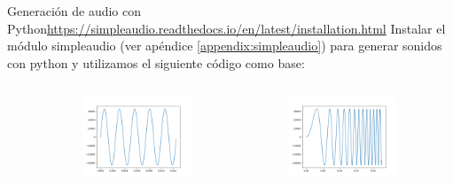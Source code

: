  \begin{frame}[t]{Generación de audio con Python}{\tiny{\href{https://simpleaudio.readthedocs.io/en/latest/installation.html}{https://simpleaudio.readthedocs.io/en/latest/installation.html}}}
    \handsonicon
    \normalsize
    Instalar el módulo simpleaudio \tiny{(ver apéndice \ref{appendix:simpleaudio})} \normalsize para generar sonidos con python y utilizamos el siguiente código como base:
    \begin{columns}[t]
       \begin{column}{0.5\textwidth}
       
    \end{column}
       \begin{column}{0.5\textwidth}
       \center\includegraphics[width=6cm,height=2.4cm]{2_clase/audio_gen1.png}
       \center\includegraphics[width=6cm,height=2.4cm]{2_clase/audio_gen2.png}
    \end{column}
    \end{columns}
   \vfill
 \end{frame}
